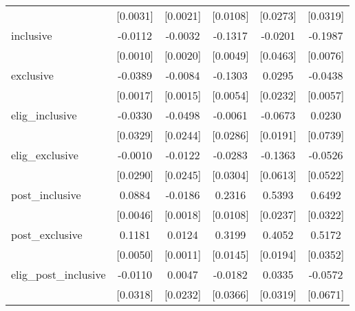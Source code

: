 \begin{table}[htbp]
\begin{tabular}{l*{5}{c}}
                    &    [0.0031]         &    [0.0021]         &    [0.0108]         &    [0.0273]         &    [0.0319]         \\
\addlinespace
inclusive           &     -0.0112\sym{***}&     -0.0032         &     -0.1317\sym{***}&     -0.0201         &     -0.1987\sym{***}\\
                    &    [0.0010]         &    [0.0020]         &    [0.0049]         &    [0.0463]         &    [0.0076]         \\
\addlinespace
exclusive           &     -0.0389\sym{***}&     -0.0084\sym{***}&     -0.1303\sym{***}&      0.0295         &     -0.0438\sym{***}\\
                    &    [0.0017]         &    [0.0015]         &    [0.0054]         &    [0.0232]         &    [0.0057]         \\
\addlinespace
elig\_inclusive      &     -0.0330         &     -0.0498\sym{*}  &     -0.0061         &     -0.0673\sym{***}&      0.0230         \\
                    &    [0.0329]         &    [0.0244]         &    [0.0286]         &    [0.0191]         &    [0.0739]         \\
\addlinespace
elig\_exclusive      &     -0.0010         &     -0.0122         &     -0.0283         &     -0.1363\sym{**} &     -0.0526         \\
                    &    [0.0290]         &    [0.0245]         &    [0.0304]         &    [0.0613]         &    [0.0522]         \\
\addlinespace
post\_inclusive      &      0.0884\sym{***}&     -0.0186\sym{***}&      0.2316\sym{***}&      0.5393\sym{***}&      0.6492\sym{***}\\
                    &    [0.0046]         &    [0.0018]         &    [0.0108]         &    [0.0237]         &    [0.0322]         \\
\addlinespace
post\_exclusive      &      0.1181\sym{***}&      0.0124\sym{***}&      0.3199\sym{***}&      0.4052\sym{***}&      0.5172\sym{***}\\
                    &    [0.0050]         &    [0.0011]         &    [0.0145]         &    [0.0194]         &    [0.0352]         \\
\addlinespace
elig\_post\_inclusive &     -0.0110         &      0.0047         &     -0.0182         &      0.0335         &     -0.0572         \\
                    &    [0.0318]         &    [0.0232]         &    [0.0366]         &    [0.0319]         &    [0.0671]         \\

\end{tabular}
\end{table}
